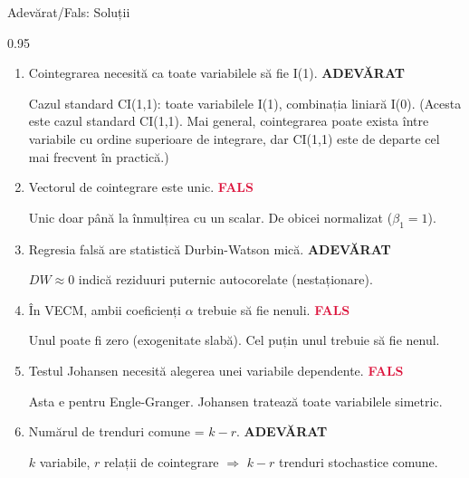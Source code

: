 \documentclass[9pt, aspectratio=169, t]{beamer}
\begin{document}
\begin{frame}{Adevărat/Fals: Soluții}
    \begin{cminipage}{0.95\textwidth}
    {\small
    \begin{enumerate}\setlength{\itemsep}{1pt}
        \item Cointegrarea necesită ca toate variabilele să fie I(1). \hfill \textcolor{Forest}{\textbf{ADEVĂRAT}}

        {\footnotesize \textcolor{MediumGray}{Cazul standard CI(1,1): toate variabilele I(1), combinația liniară I(0). (Acesta este cazul standard CI(1,1). Mai general, cointegrarea poate exista între variabile cu ordine superioare de integrare, dar CI(1,1) este de departe cel mai frecvent în practică.)}}

        \item Vectorul de cointegrare este unic. \hfill \textcolor{Crimson}{\textbf{FALS}}

        {\footnotesize \textcolor{MediumGray}{Unic doar până la înmulțirea cu un scalar. De obicei normalizat ($\beta_1 = 1$).}}

        \item Regresia falsă are statistică Durbin-Watson mică. \hfill \textcolor{Forest}{\textbf{ADEVĂRAT}}

        {\footnotesize \textcolor{MediumGray}{$DW \approx 0$ indică reziduuri puternic autocorelate (nestaționare).}}

        \item În VECM, ambii coeficienți $\alpha$ trebuie să fie nenuli. \hfill \textcolor{Crimson}{\textbf{FALS}}

        {\footnotesize \textcolor{MediumGray}{Unul poate fi zero (exogenitate slabă). Cel puțin unul trebuie să fie nenul.}}

        \item Testul Johansen necesită alegerea unei variabile dependente. \hfill \textcolor{Crimson}{\textbf{FALS}}

        {\footnotesize \textcolor{MediumGray}{Asta e pentru Engle-Granger. Johansen tratează toate variabilele simetric.}}

        \item Numărul de trenduri comune = $k - r$. \hfill \textcolor{Forest}{\textbf{ADEVĂRAT}}

        {\footnotesize \textcolor{MediumGray}{$k$ variabile, $r$ relații de cointegrare $\Rightarrow$ $k-r$ trenduri stochastice comune.}}
    \end{enumerate}
    }
    \end{cminipage}
\end{frame}
\end{document}
